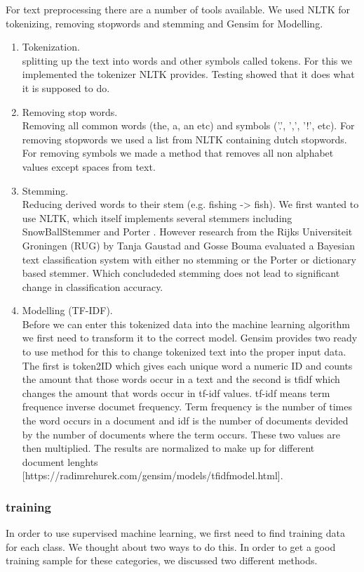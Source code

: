 For text preprocessing there are a number of tools available. We used NLTK \cite{nlkt_stemming} for tokenizing, removing stopwords and stemming and Gensim \cite{Gensim} for Modelling.
\begin{enumerate}
\item Tokenization. \\ splitting up the text into words and other symbols called tokens. For this we implemented the tokenizer NLTK provides. Testing showed that it does what it is supposed to do.
\item Removing stop words. \\ Removing all common words (the, a, an etc) and symbols ('.', ',', '!', etc). For removing stopwords we used a list from NLTK containing dutch stopwords. For removing symbols we made a method that removes all non alphabet values except spaces from text. 
\item Stemming. \\ Reducing derived words to their stem (e.g. fishing -> fish). We first wanted to use NLTK, which itself implements several stemmers including SnowBallStemmer \cite{snowball_dutch} and Porter \cite{porter_Stemmer}. However research from the Rijks Universiteit Groningen (RUG) by Tanja Gaustad and Gosse Bouma \cite{gaustad2002accurate} evaluated a Bayesian text classification system with either no stemming or the Porter or dictionary based stemmer. Which concludeded stemming does not lead to significant change in classification accuracy.
\item Modelling (TF-IDF). \\ Before we can enter this tokenized data into the machine learning algorithm we first need to transform it to the correct model. Gensim provides two ready to use method for this to change tokenized text into the proper input data. The first is token2ID which gives each unique word a numeric ID and counts the amount that those words occur in a text and the second is tfidf which changes the amount that words occur in tf-idf values. tf-idf means term frequence inverse documet frequency. Term frequency is the number of times the word occurs in a document and idf is the number of documents devided by the number of documents where the term occurs. These two values are then multiplied. The results are normalized to make up for different document lenghts [https://radimrehurek.com/gensim/models/tfidfmodel.html].
\end{enumerate}

\subsubsection{training}
In order to use supervised machine learning, we first need to find training data for each class. We thought about two ways to do this. In order to get a good training sample for these categories, we discussed two different methods. \\

